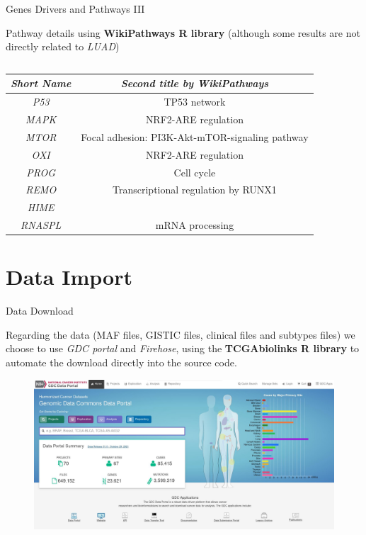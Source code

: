 \documentclass{beamer}
\begin{document}
\begin{frame}{Genes Drivers and Pathways III}
\begin{block}{Pathway details using \textbf{WikiPathways R library}
      \cite{wikipw} (although some results are not directly related to
      \textit{LUAD})}
\begin{table}[H]
{\begin{tabular}{c||c}
        \end{tabular}%
      } %
      {%
        \begin{tabular}{c||c}
          \textbf{\textit{Short Name}} &\textit{Second title by WikiPathways}\\ 
          \hline
          \hline
          \textit{P53} & TP53 network\\
          \hline
          \textit{MAPK} & NRF2-ARE regulation\\ 
          \hline
          \textit{MTOR} & Focal adhesion: PI3K-Akt-mTOR-signaling pathway\\
          \hline
          \textit{OXI} & NRF2-ARE regulation\\
          \hline
          \textit{PROG} & Cell cycle\\
          \hline
          \textit{REMO} & Transcriptional regulation by RUNX1\\
          \hline
          \textit{HIME} & \\
          \hline
          \textit{RNASPL} & mRNA processing\\
        \end{tabular}%
      }%
    \end{table}   
  \end{block} 
\end{frame}
\section{Data Import}
\begin{frame}{Data Download}
  \begin{block}{}
    Regarding the data (MAF files, GISTIC files, clinical files and subtypes
    files) we choose to use \textit{GDC portal} and \textit{Firehose}, using the
    \textbf{TCGAbiolinks R  library} \cite{tcgabiolinks} to automate the
    download directly into the source code.   
  \end{block}
  \begin{figure}
    \centering
    \includegraphics[scale = 0.14]{img/gdc.jpg}
  \end{figure}
\end{frame}
\end{document}

